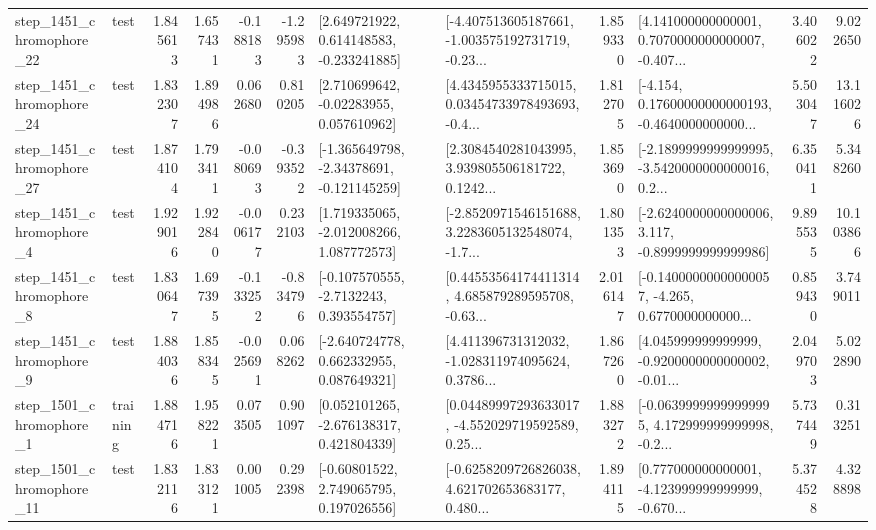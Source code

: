 \begin{tabular}{llrrrrllrlrr}
 step\_1451\_chromophore\_22 &      test &      1.845613 &    1.657431 &     -0.188183 & -1.295983 &    [2.649721922, 0.614148583, -0.233241885] &  [-4.407513605187661, -1.003575192731719, -0.23... &       1.859330 &  [4.141000000000001, 0.7070000000000007, -0.407... &            3.406022 &          9.022650 \\
 step\_1451\_chromophore\_24 &      test &      1.832307 &    1.894986 &      0.062680 &  0.810205 &     [2.710699642, -0.02283955, 0.057610962] &  [4.4345955333715015, 0.03454733978493693, -0.4... &       1.812705 &  [-4.154, 0.17600000000000193, -0.4640000000000... &            5.503047 &         13.116026 \\
 step\_1451\_chromophore\_27 &      test &      1.874104 &    1.793411 &     -0.080693 & -0.393522 &   [-1.365649798, -2.34378691, -0.121145259] &  [2.3084540281043995, 3.939805506181722, 0.1242... &       1.853690 &  [-2.1899999999999995, -3.5420000000000016, 0.2... &            6.350411 &          5.348260 \\
  step\_1451\_chromophore\_4 &      test &      1.929016 &    1.922840 &     -0.006177 &  0.232103 &    [1.719335065, -2.012008266, 1.087772573] &  [-2.8520971546151688, 3.2283605132548074, -1.7... &       1.801353 &  [-2.6240000000000006, 3.117, -0.8999999999999986] &            9.895535 &         10.103866 \\
  step\_1451\_chromophore\_8 &      test &      1.830647 &    1.697395 &     -0.133252 & -0.834796 &     [-0.107570555, -2.7132243, 0.393554757] &  [0.44553564174411314, 4.685879289595708, -0.63... &       2.016147 &  [-0.14000000000000057, -4.265, 0.6770000000000... &            0.859430 &          3.749011 \\
  step\_1451\_chromophore\_9 &      test &      1.884036 &    1.858345 &     -0.025691 &  0.068262 &    [-2.640724778, 0.662332955, 0.087649321] &  [4.411396731312032, -1.028311974095624, 0.3786... &       1.867260 &  [4.045999999999999, -0.9200000000000002, -0.01... &            2.049703 &          5.022890 \\
  step\_1501\_chromophore\_1 &  training &      1.884716 &    1.958221 &      0.073505 &  0.901097 &    [0.052101265, -2.676138317, 0.421804339] &  [0.04489997293633017, -4.552029719592589, 0.25... &       1.883272 &  [-0.06399999999999995, 4.172999999999998, -0.2... &            5.737449 &          0.313251 \\
 step\_1501\_chromophore\_11 &      test &      1.832116 &    1.833121 &      0.001005 &  0.292398 &     [-0.60801522, 2.749065795, 0.197026556] &  [-0.6258209726826038, 4.621702653683177, 0.480... &       1.894115 &  [0.777000000000001, -4.123999999999999, -0.670... &            5.374528 &          4.328898 \\

\end{tabular}
